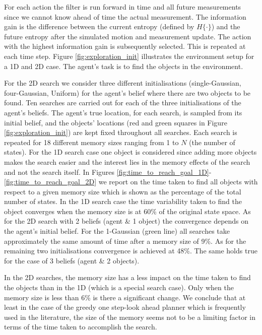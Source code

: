 \documentclass{frontiersSCNS} %
\begin{document}
For each action the filter is run forward in time and all future measurements since we cannot know ahead of time the actual 
measurement. The information gain is the difference between the current entropy (defined 
by $H\{\cdot\}$) and the future entropy after the simulated motion and measurement update. The action with the highest information gain 
is subsequently selected. This is repeated at each time step. Figure \ref{fig:exploration_init} illustrates the environment setup for 
a 1D and 2D case. The agent's task is to find the objects in the environment.


For the 2D search we consider three different initialisations (single-Gaussian, four-Gaussian, Uniform) for the agent's belief where there are 
two objects to be found. Ten searches are carried out for each of the three initialisations of the agent's beliefs. 
The agent's true location, for each search, is sampled from its initial belief, and the objects' locations 
(red and green squares in Figure \ref{fig:exploration_init}) are kept fixed throughout all searches. Each search is repeated for 
18 different memory sizes ranging from 1 to $N$ (the number of states). For the 1D search case one object is considered since adding more objects  
makes the search easier and the interest lies in the memory effects of the search and not the search itself. In Figures \ref{fig:time_to_reach_goal_1D}-\ref{fig:time_to_reach_goal_2D} we 
report on the time taken to find all objects with respect to a given memory size which is shown as the percentage of the total number of states. 
In the 1D search case the time variability taken to find the object converges when the memory size is at 60\% of the original state space. 
As for the 2D search with 2 beliefs (agent \& 1 object) the convergence depends on the agent's initial belief. For the 1-Gaussian (green line) 
all searches take approximately the same amount of time after a memory size of 9\%. As for the remaining two initialisations convergence is achieved at  48\%. 
The same holds true for the case of 3 beliefs (agent \& 2 objects).

In the 2D searches, the memory size has a less impact on the time taken to find the objects than in the 1D (which is a special search case). 
Only when the memory size is less than 6\% is there a significant change. We conclude that at least in the case of 
the greedy one step-look ahead planner which is frequently used in the literature, the size of the memory seems not to be a limiting factor in terms of the time taken to accomplish the search.
\end{document}
